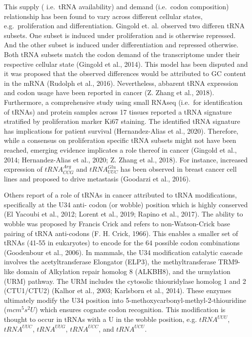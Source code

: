 \documentclass[12pt,openany]{book}
\begin{document}
This supply ( i.e.~tRNA availability) and demand (i.e.~codon
composition) relationship has been found to vary across different
cellular states, e.g.~proliferation and differentiation. Gingold et. al.
observed two differen tRNA subsets. One subset is induced under
proliferation and is otherwise repressed. And the other subset is
induced under differentiation and repressed otherwise. Both tRNA subsets
match the codon demand of the transcriptome under their respective
cellular state (Gingold et al., 2014). This model has been disputed and
it was proposed that the observed differences would be attributed to GC
content in the mRNA (Rudolph et al., 2016). Nevertheless, abbarent tRNA
expression and codon usage have been reported in cancer (Z. Zhang et
al., 2018). Furthermore, a comprehensive study using small RNAseq
(i.e.~for identification of tRNAs) and protein samples across 17 tissues
reported a tRNA signature stratified by proliferation marker Ki67
staining. The identified tRNA signature has implications for patient
survival (Hernandez-Alias et al., 2020). Therefore, while a consensus on
proliferation specific tRNA subsets might not have been reached,
emerging evidence implicates a role thereof in cancer (Gingold et al.,
2014; Hernandez-Alias et al., 2020; Z. Zhang et al., 2018). For
instance, increased expression of \(tRNA_{CCG}^{Arg}\) and
\(tRNA_{UUC}^{Glu}\) has been observed in breast cancer cell lines and
proposed to drive metastasis (Goodarzi et al., 2016).

Others report of a role of tRNAs in cancer attributed to tRNA
modifications, specifically at the U34 anti- codon (or wobble) position
which is highly conserved (El Yacoubi et al., 2012; Lorent et al., 2019;
Rapino et al., 2017). The ability to wobble was proposed by Francis
Crick and refers to non-Watson-Crick base pairing of tRNA anti-codons
(F. H. Crick, 1966). This enables a smaller set of tRNAs (41-55 in
eukaryotes) to encode for the 64 possible codon combinations (Goodenbour
et al., 2006). In mammals, the U34 modification catalytic cascade
involves the acetyltransferase Elongator (ELP3), the methyltransferase
TRM9-like domain of Alkylation repair homolog 8 (ALKBH8), and the
urmylation (URM) pathway. The URM includes the cytosolic thiouridylase
homolog 1 and 2 (CTU1/CTU2) (Kalhor et al., 2003; Karlsborn et al.,
2014). These enzymes ultimately modify the U34 position into
5-methoxycarbonyl-methyl-2-thiouridine (\(mcm^5s^2U\)) which ensures
cognate codon recognition. This modification is thought to occur in
tRNAs with a U in the wobble position, e.g. \(tRNA^{UUU}\),
\(tRNA^{UUC}\), \(tRNA^{UUG}\), \(tRNA^{UCC}\), and \(tRNA^{UCU}\).
\end{document}
